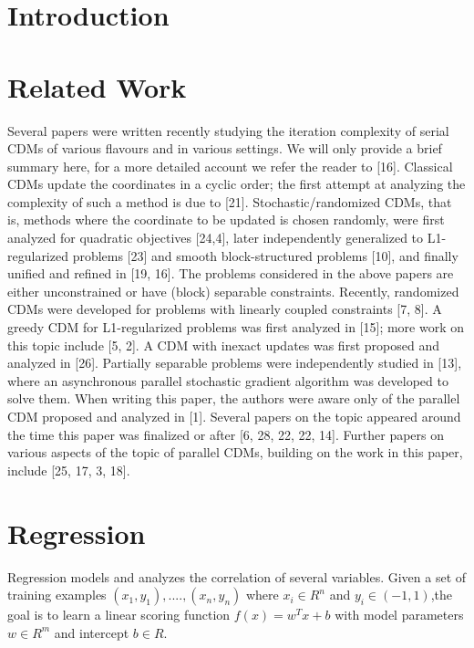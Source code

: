 \documentclass{sigplanconf}
\begin{document}
\section{Introduction}

\section{Related Work}
Several papers were written recently studying the iteration complexity of serial CDMs of various flavours and in various settings. 
We will only provide a brief summary here, for a more detailed account we refer the reader to [16]. Classical CDMs update the coordinates in a cyclic order; 
the first attempt at analyzing the complexity of such a method is due to [21]. Stochastic/randomized CDMs, that is, methods where
the coordinate to be updated is chosen randomly, were first analyzed for quadratic objectives [24,4], later independently generalized to
L1-regularized problems [23] and smooth block-structured problems [10], and finally unified and refined in [19, 16]. 
The problems considered in the above papers are either unconstrained or have (block) separable constraints. Recently, randomized CDMs
were developed for problems with linearly coupled constraints [7, 8]. A greedy CDM for L1-regularized problems was 
first analyzed in [15]; more work on this topic include [5, 2]. A CDM with inexact updates was first proposed and analyzed in [26]. Partially
separable problems were independently studied in [13], where an asynchronous parallel stochastic
gradient algorithm was developed to solve them.
When writing this paper, the authors were aware only of the parallel CDM proposed and analyzed in [1]. Several papers on the 
topic appeared around the time this paper was finalized or after [6, 28, 22, 22, 14]. Further papers on various aspects of the 
topic of parallel CDMs, building on the work in this paper, include [25, 17, 3, 18].

\section{Regression}
\noindent
Regression models and analyzes the correlation of several variables. Given a set of training examples 
\begin{math}(x_1,y_1),....,(x_n,y_n)\end{math} where \begin{math} x_i \in R^n \end{math}
and \begin{math} y_i \in (-1,1) \end{math},the goal is to learn a linear scoring function
\begin{math} f(x) = w^Tx + b \end{math} with model parameters \begin{math} w \in R^m \end{math}
and intercept \begin{math} b \in R. \end{math}\\
\end{document}
